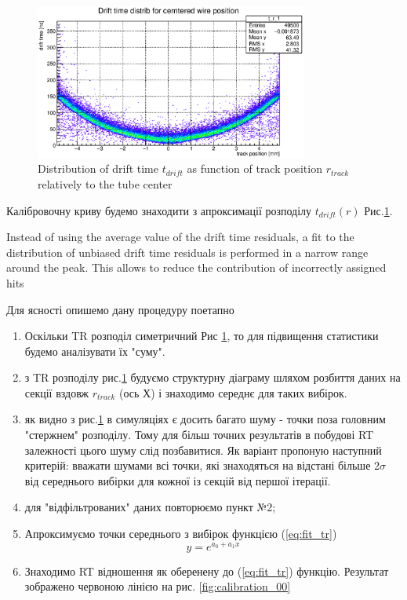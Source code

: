 \documentclass[]{article}
\begin{document}
	\begin{figure}[h]
	\includegraphics[width=0.8\textwidth]{t_r_distr_00.eps}
	\centering
	\caption{ Distribution of drift time $t_{drift}$ as function of track position $r_{track}$ relatively to the tube center} 
	\label{fig:t_r_distr_00}
	\end{figure}
	
	Калібровочну криву будемо знаходити з апроксимації розподілу $t_{drift}(r)$ Рис.\ref{fig:t_r_distr_00}.
	
	
	Instead of using the average value of the drift time residuals, a fit to the distribution
of unbiased drift time residuals is performed in a narrow range around
the peak. This allows to reduce the contribution of incorrectly assigned hits

	Для ясності опишемо дану процедуру поетапно
	\begin{enumerate}
	\item Оскільки TR розподіл симетричний Рис \ref{fig:t_r_distr_00}, то для підвищення статистики будемо аналізувати їх "суму".
	\item з TR розподілу рис.\ref{fig:t_r_distr_00} будуємо структурну діаграму шляхом розбиття даних на секції вздовж $r_{track}$ (ось Х) і знаходимо середнє для таких вибірок.
	\item як видно з рис.\ref{fig:t_r_distr_00} в симуляціях є досить багато шуму - точки поза головним "стержнем" розподілу. Тому для більш точних результатів в побудові RT залежності цього шуму слід позбавитися. Як варіант пропоную наступний критерій: вважати шумами всі точки, які знаходяться на відстані більше $2 \sigma $ від середнього вибірки для кожної із секцій від першої ітерації.
	\item для "відфільтрованих" даних повторюємо пункт №2;
	\item Апроксимуємо точки середнього з вибірок функцією (\ref{eq:fit_tr})
	\begin{equation}
		y = e^{a_0 +a_1x}
		\label{eq:fit_tr}
	\end{equation}
	\item Знаходимо RT відношення як оберенену до (\ref{eq:fit_tr})  функцію. Результат зображено червоною лінією на рис. \ref{fig:calibration_00}
	\end{enumerate}
	
\end{document}
